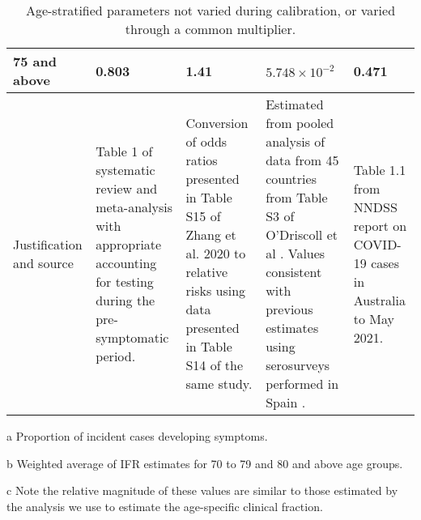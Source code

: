 \begin{table}
\begin{threeparttable}
\begin{tabularx}{\textwidth}{| X | X | X | X | X |}
        \hline
        75 and above & 0.803 & 1.41 & $5.748\times10^{-2}$\tnote{b} & 0.471 \\
        \hline
        Justification and source & 
        Table 1 of systematic review and meta-analysis with appropriate accounting for testing during the pre-symptomatic period\cite{sah-2021}. & 
        Conversion of odds ratios presented in Table S15 of Zhang et al. 2020 to relative risks using data presented in Table S14 of the same study\cite{zhang-2020-a}\tnote{c}. &
        Estimated from pooled analysis of data from 45 countries from Table S3 of O'Driscoll et al \cite{odriscoll-2021}. 
        Values consistent with previous estimates using serosurveys performed in Spain \cite{pollan-2020}. &
        Table 1.1 from NNDSS report on COVID-19 cases in Australia to May 2021. \\ 
        \hline
	\end{tabularx}
	\caption{Age-stratified parameters not varied during calibration, or varied through a common multiplier.}
	\label{tab:age_params}
    \begin{tablenotes}
        \item[a] Proportion of incident cases developing symptoms.
        \item[b] Weighted average of IFR estimates for 70 to 79 and 80 and above age groups.
        \item[c] Note the relative magnitude of these values are similar to those estimated by the analysis we use to estimate the age-specific clinical fraction.
    \end{tablenotes}
    \end{threeparttable}
\end{table}
